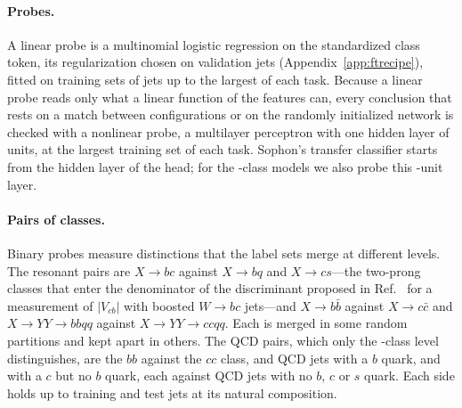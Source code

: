 \documentclass[11pt]{article}
\newcommand{\Kfull}{\VocabSizeLoneeighteight}
\begin{document}
\paragraph{Probes.} A linear probe is a multinomial logistic regression on the standardized class
token, its regularization chosen on validation jets (Appendix~\ref{app:ftrecipe}), fitted on
training sets of \FtSizeEThree{} jets up to the largest of each task. Because a linear probe reads
only what a linear function of the features can, every conclusion that rests on a match between
configurations or on the randomly initialized network is checked with a nonlinear probe, a
multilayer perceptron with one hidden layer of \LpMlpHidden{} units, at the largest training set of
each task. Sophon's transfer classifier starts from the hidden layer of the head; for the
\Kfull-class models we also probe this \DesignHeadHidden-unit layer.

\paragraph{Pairs of classes.} Binary probes measure distinctions that the label sets merge at
different levels. The resonant pairs are $X\to bc$ against $X\to bq$ and $X\to cs$---the two-prong
classes that enter the denominator of the discriminant proposed in Ref.~\cite{vcbboosted} for a
measurement of $|V_{cb}|$ with boosted $W\to bc$ jets---and $X\to b\bar b$ against $X\to c\bar c$ and
$X\to YY\to bbqq$ against $X\to YY\to ccqq$. Each is merged in some random partitions and kept apart
in others. The QCD pairs, which only the \Kfull-class level distinguishes, are the $bb$ against the
$cc$ class, and QCD jets with a $b$ quark, and with a $c$ but no $b$ quark, each against QCD jets
with no $b$, $c$ or $s$ quark. Each side holds up to \JcBalPairTrainPerSide{} training and
\JcBalPairTestPerSide{} test jets at its natural composition.
\end{document}
